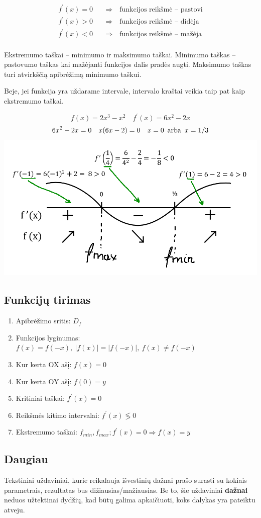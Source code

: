 \begin{align}
    f^\prime(x) = 0 \quad &\Rightarrow \quad \text{funkcijos reikšmė -- pastovi} \\
    f^\prime(x) > 0 \quad &\Rightarrow \quad \text{funkcijos reikšmė -- didėja} \\
    f^\prime(x) < 0 \quad &\Rightarrow \quad \text{funkcijos reikšmė -- mažėja} \\
\end{align}

Ekstremumo taškai -- minimumo ir maksimumo taškai.
Minimumo taškas -- pastovumo taškas kai mažėjanti funkcijos dalis pradės augti.
Maksimumo taškas turi atvirkščią apibrėžimą minimumo taškui.

Beje, jei funkcija yra uždarame intervale, intervalo kraštai veikia taip pat kaip ekstremumo taškai. 

\begin{equation}
    f(x) = 2x^3 - x^2 \quad
    f^\prime(x) = 6x^2 - 2x 
\end{equation}
\begin{equation}
    6x^2 - 2x = 0 \quad
    x(6x - 2) = 0 \quad
    x = 0 \arba x = 1/3 
\end{equation}
\includegraphics[max width=\textwidth]{assets/derivatives_extreme_points.png}

\subsection{Funkcijų tirimas}

\begin{enumerate}
    \item Apibrėžimo sritis:    \quad $D_f$
    \item Funkcijos lyginumas:  \quad $f(x) = f(-x),\ |f(x)| = |f(-x)|,\ f(x) \ne f(-x)$
    \item Kur kerta OX ašį:     \quad $f(x) = 0$
    \item Kur kerta OY ašį:     \quad $f(0) = y$
    \item Kritiniai taškai:     \quad $f^\prime(x) = 0$
    \item Reikšmės kitimo intervalai: \quad $f^\prime(x) \lessgtr 0$
    \item Ekstremumo taškai:    \quad $f_{min}, f_{max}; f^\prime(x) = 0 \Rightarrow f(x) = y$
\end{enumerate}

\subsection{Daugiau}

Tekstiniai uždaviniai, kurie reikalauja išvestinių dažnai prašo surasti su kokiais parametrais, rezultatas bus dižiausias/mažiausias. Be to, šie uždaviniai \textbf{dažnai} neduos užtektinai dydžių, kad būtų galima apkaičiuoti, koks dalykas yra pateiktu atveju.  


